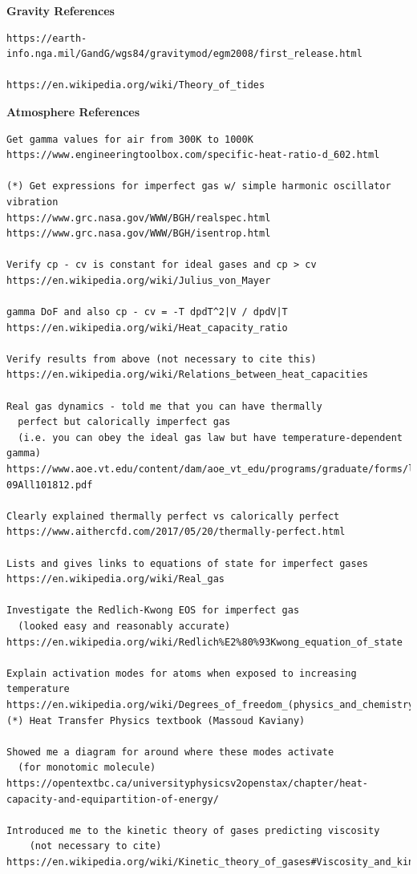 \documentclass[11pt,dvipsnames]{thesis}
\begin{document}
{\centering\textbf{\Large Gravity References}}
\begin{verbatim}
https://earth-info.nga.mil/GandG/wgs84/gravitymod/egm2008/first_release.html

https://en.wikipedia.org/wiki/Theory_of_tides
\end{verbatim}

{\centering\textbf{\Large Atmosphere References}}
\begin{verbatim}
Get gamma values for air from 300K to 1000K
https://www.engineeringtoolbox.com/specific-heat-ratio-d_602.html

(*) Get expressions for imperfect gas w/ simple harmonic oscillator vibration
https://www.grc.nasa.gov/WWW/BGH/realspec.html
https://www.grc.nasa.gov/WWW/BGH/isentrop.html

Verify cp - cv is constant for ideal gases and cp > cv
https://en.wikipedia.org/wiki/Julius_von_Mayer

gamma DoF and also cp - cv = -T dpdT^2|V / dpdV|T
https://en.wikipedia.org/wiki/Heat_capacity_ratio

Verify results from above (not necessary to cite this)
https://en.wikipedia.org/wiki/Relations_between_heat_capacities

Real gas dynamics - told me that you can have thermally
  perfect but calorically imperfect gas
  (i.e. you can obey the ideal gas law but have temperature-dependent gamma)
https://www.aoe.vt.edu/content/dam/aoe_vt_edu/programs/graduate/forms/lectnotes3-09All101812.pdf

Clearly explained thermally perfect vs calorically perfect
https://www.aithercfd.com/2017/05/20/thermally-perfect.html

Lists and gives links to equations of state for imperfect gases
https://en.wikipedia.org/wiki/Real_gas

Investigate the Redlich-Kwong EOS for imperfect gas
  (looked easy and reasonably accurate)
https://en.wikipedia.org/wiki/Redlich%E2%80%93Kwong_equation_of_state

Explain activation modes for atoms when exposed to increasing temperature
https://en.wikipedia.org/wiki/Degrees_of_freedom_(physics_and_chemistry)
(*) Heat Transfer Physics textbook (Massoud Kaviany)

Showed me a diagram for around where these modes activate
  (for monotomic molecule)
https://opentextbc.ca/universityphysicsv2openstax/chapter/heat-capacity-and-equipartition-of-energy/

Introduced me to the kinetic theory of gases predicting viscosity
  	(not necessary to cite)
https://en.wikipedia.org/wiki/Kinetic_theory_of_gases#Viscosity_and_kinetic_momentum


\end{verbatim}
\end{document}
